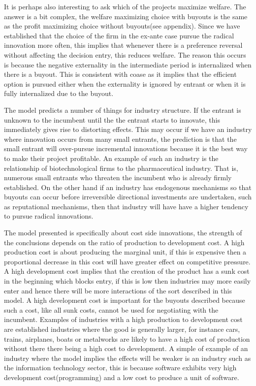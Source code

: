 It is perhaps also interesting to ask which of the projects maximize welfare. The answer is a bit complex, the welfare maximizing choice with buyouts is the same as the profit maximizing choice without buyouts(see appendix). Since we have established that the choice of the firm in the ex-ante case pursue the radical innovation more often, this implies that whenever there is a preference reversal without affecting the decision entry, this reduces welfare. The reason this occurs is because the negative externality in the intermediate period is internalized when there is a buyout. This is consistent with coase as it implies that the efficient option is pursued either when the externality is ignored by entrant or when it is fully internalized due to the buyout.

The model predicts a number of things for industry structure. If the entrant is unknown to the incumbent until the the entrant starts to innovate, this immediately gives rise to distorting effects.  This may occur if we have an industry where innovation occurs from many small entrants, the prediction is that the small entrant will over-pursue incremental innovations because it is the best way to make their project profitable. An example of such an industry is the relationship of biotechnological firms to the pharmaceutical industry. That is, numerous small entrants who threaten the incumbent who is already firmly established. On the other hand if an industry has endogenous mechanisms so that buyouts can occur before irreversible directional investments are undertaken, such as reputational mechanisms, then that industry will have have a higher tendency to pursue radical innovations. 

The model presented is specifically about cost side innovations, the strength of the conclusions depends on the ratio of production to development cost. A high production cost is about producing the marginal unit, if this is expensive then a proportional decrease in this cost will have greater effect on competitive pressure. A high development cost implies that the creation of the product has a sunk cost in the beginning which blocks entry, if this is low then industries may more easily enter and hence there will be more interactions of the sort described in this model. A high development cost is important for the buyouts described because such a cost, like all sunk costs, cannot be used for negotiating with the incumbent. Examples of industries with a high production to development cost are established industries where the good is generally larger, for instance cars, trains, airplanes, boats or metalworks are likely to have a high cost of production without there there being a high cost to development. A simple of example of an industry where the model implies the effects will be weaker is an industry such as the information technology sector, this is because software exhibits very high development cost(programming) and a low cost to produce a unit of software.  


